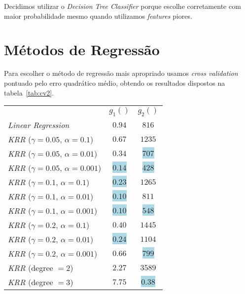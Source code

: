 \documentclass[a4paper,twocolumn]{article}
\begin{document}
    Decidimos utilizar o \textit{Decision Tree Classifier} porque escolhe corretamente com maior probabilidade mesmo quando
    utilizamos \textit{features} piores.

    \section{Métodos de Regressão}
    Para escolher o método de regressão mais apropriado usamos \textit{cross validation} pontuado pelo erro quadrático
    médio, obtendo os resultados dispostos na tabela~\ref{tab:cv2}.

    \begin{table}[ht]
        \centering
        \begin{tabular}{ l c c }
            & $g_1()$ & $g_2()$ \\
         \textit{Linear Regression}                                      & $0.94$ & $816$ \\
         \textit{KRR\footnotemark[1]} ($\gamma = 0.05$, $\alpha = 0.1$)   & $0.67$ & $1235$ \\
         \textit{KRR\footnotemark[1]} ($\gamma = 0.05$, $\alpha = 0.01$)  & $0.34$ & \colorbox{lightblue}{$707$} \\
         \textit{KRR\footnotemark[1]} ($\gamma = 0.05$, $\alpha = 0.001$) & \colorbox{lightblue}{$0.14$} & \colorbox{lightblue}{$428$} \\
         \textit{KRR\footnotemark[1]} ($\gamma = 0.1$,  $\alpha = 0.1$)   & \colorbox{lightblue}{$0.23$} & $1265$ \\
         \textit{KRR\footnotemark[1]} ($\gamma = 0.1$,  $\alpha = 0.01$)  & \colorbox{lightblue}{$0.10$} & $811$ \\
         \textit{KRR\footnotemark[1]} ($\gamma = 0.1$,  $\alpha = 0.001$) & \colorbox{lightblue}{$0.10$} & \colorbox{lightblue}{$548$} \\
         \textit{KRR\footnotemark[1]} ($\gamma = 0.2$,  $\alpha = 0.1$)   & $0.40$ & $1445$ \\
         \textit{KRR\footnotemark[1]} ($\gamma = 0.2$,  $\alpha = 0.01$)  & \colorbox{lightblue}{$0.24$} & $1104$ \\
         \textit{KRR\footnotemark[1]} ($\gamma = 0.2$,  $\alpha = 0.001$) & $0.66$ & \colorbox{lightblue}{$799$} \\
         \textit{KRR\footnotemark[2]} (degree $= 2$)                      & $2.27$ & $3589$ \\
         \textit{KRR\footnotemark[2]} (degree $= 3$)                      & $7.75$ & \colorbox{lightblue}{$0.38$} \\

\end{tabular}
\end{table}
\end{document}
